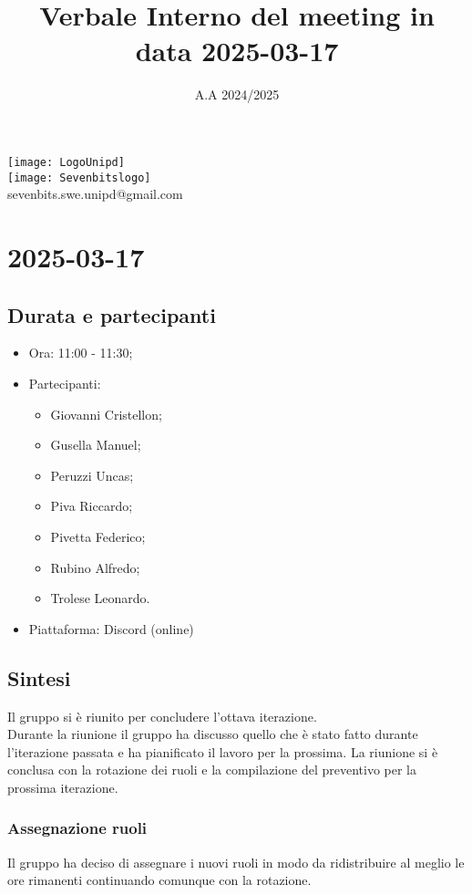 \documentclass[10pt]{article}
\title{Verbale Interno del meeting in data 2025-03-17}
\date{A.A 2024/2025}
\begin{document}
\maketitle
\begin{center}
\texttt{[image: LogoUnipd]}\\
\texttt{[image: Sevenbitslogo]}\\
sevenbits.swe.unipd@gmail.com\\
\vspace{2mm}
\end{center}
\newpage
\tableofcontents
\newpage
\section{2025-03-17}
\subsection{Durata e partecipanti}
\begin{itemize}
\item Ora: 11:00 - 11:30;
\item Partecipanti:
	\begin{itemize}
    \item Giovanni Cristellon;
		\item Gusella Manuel;
		\item Peruzzi Uncas;
		\item Piva Riccardo;
		\item Pivetta Federico;
		\item Rubino Alfredo;
		\item Trolese Leonardo.
	\end{itemize}
\item Piattaforma: Discord (online)
\end{itemize}

\subsection{Sintesi}
Il gruppo si è riunito per concludere l'ottava iterazione.\\
Durante la riunione il gruppo ha discusso quello che è stato fatto durante l'iterazione passata e ha pianificato il lavoro per la prossima. La riunione si è conclusa con la rotazione dei ruoli e la compilazione del preventivo per la prossima iterazione.

\subsubsection{Assegnazione ruoli}
Il gruppo ha deciso di assegnare i nuovi ruoli in modo da ridistribuire al meglio le ore rimanenti continuando comunque con la rotazione.
\end{document}
